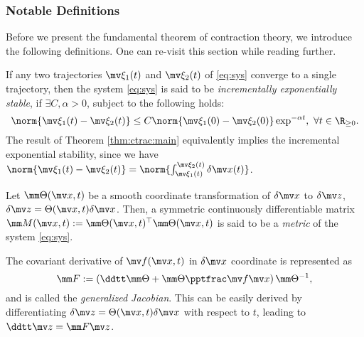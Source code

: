 \subsubsection{Notable Definitions}

Before we present the fundamental theorem of contraction theory, we introduce the following definitions.
One can re-visit this section while reading further.

\begin{definition}  
    If any two trajectories $\mv\xi_1(t)$ and $\mv\xi_2(t)$ of \eqref{eq:sys} converge to a single trajectory, then the system \eqref{eq:sys} is said to be \textit{incrementally exponentially stable}, if $\exists C,\alpha>0$, subject to the following holds:
    \begin{equation}      
        \norm{\mv\xi_1(t)-\mv\xi_2(t)}
        \le 
        C
        \norm{\mv\xi_1(0)-\mv\xi_2(0)}
        \exp^{-\alpha t}
        ,\ \forall t\in\R_{\ge 0}
        .
    \end{equation}
    The result of Theorem \ref{thm:ctrac:main} equivalently implies the incremental exponential stability, since we have $\norm{\mv\xi_1(t)-\mv\xi_2(t)}= \norm{\int_{\mv\xi_1(t)}^{\mv\xi_2(t)}\delta\bdx(t)}$.
    \label{def:inc_exp_stable}
\end{definition}

\begin{definition}
    Let $\mm\Theta(\bdx,t)$ be a smooth coordinate transformation of $\delta\bdx$ to $\delta\bdz$, \ie $\delta\bdz = \Theta(\bdx,t)\delta\bdx$.
    Then, a symmetric continuously differentiable matrix $\mm M(\bdx,t):=\mm\Theta(\bdx,t)^\top\mm\Theta(\bdx,t)$ is said to be a \textit{metric} of the system \eqref{eq:sys}.
    \label{def:metric}
\end{definition}

\begin{definition}
    The covariant derivative of $\mv f(\bdx,t)$ in $\delta\bdx$ coordinate is represented as 
    \begin{equation}
        \mm F
        :=
        \left(
            \ddtt\mm\Theta
            +
            \mm\Theta\tpfpx
        \right)
        \mm\Theta^{-1}
        ,
    \end{equation}
    and is called the \textit{generalized Jacobian}.
    This can be easily derived by differentiating $\delta\bdz = \Theta(\bdx,t)\delta\bdx$ with respect to $t$, leading to $\ddtt\bdz=\mm F\bdz$.
\end{definition}

